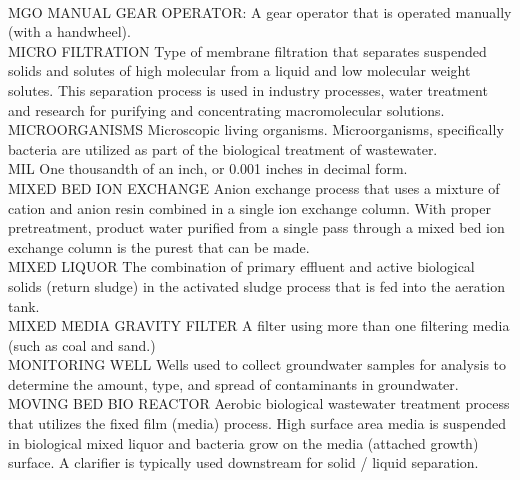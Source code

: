 \documentclass{article}
\begin{document}
\vspace{0.3cm}\\
MGO
MANUAL GEAR OPERATOR:  A gear operator that is operated manually (with a handwheel).
\vspace{0.3cm}\\
MICRO FILTRATION
Type of membrane filtration that separates suspended solids and solutes of high molecular from a liquid and low molecular weight solutes. This separation process is used in industry processes, water treatment and research for purifying and concentrating macromolecular solutions.
\vspace{0.3cm}\\
MICROORGANISMS
Microscopic living organisms. Microorganisms, specifically bacteria are utilized as part of the biological treatment of wastewater.
\vspace{0.3cm}\\
MIL
One thousandth of an inch, or 0.001 inches in decimal form.
\vspace{0.3cm}\\

MIXED BED ION EXCHANGE
Anion exchange process that uses a mixture of cation and anion resin combined in a single ion exchange column. With proper pretreatment, product water purified from a single pass through a mixed bed ion exchange column is the purest that can be made.
\vspace{0.3cm}\\
MIXED LIQUOR
The combination of primary effluent and active biological solids (return sludge) in the activated sludge process that is fed into the aeration tank.
\vspace{0.3cm}\\
MIXED MEDIA GRAVITY FILTER
A filter using more than one filtering media (such as coal and sand.)
\vspace{0.3cm}\\
MONITORING WELL
Wells used to collect groundwater samples for analysis to determine the amount, type, and spread of contaminants in groundwater.
\vspace{0.3cm}\\
MOVING BED BIO REACTOR
Aerobic biological wastewater treatment process that utilizes the fixed film (media) process. High surface area media is suspended in biological mixed liquor and bacteria grow on the media (attached growth) surface. A clarifier is typically used downstream for solid / liquid separation.
\vspace{0.3cm}\\
\end{document}
